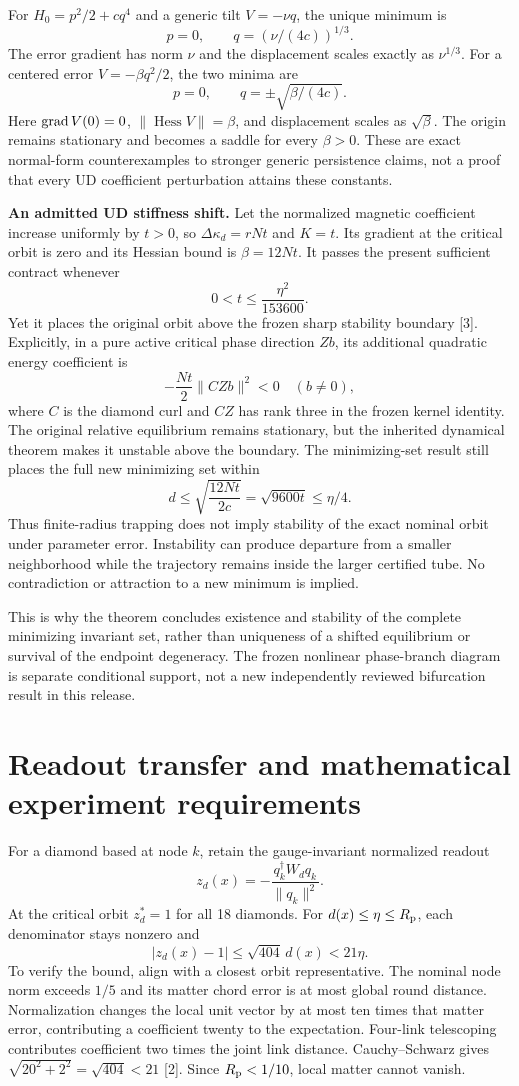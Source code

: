 \documentclass[11pt,a4paper]{article}
\begin{document}
For $H_0=p^2/2+cq^4$ and a generic tilt $V=-\nu q$, the unique minimum is
\[
p=0,\qquad q=(\nu/(4c))^{1/3}.
\]
The error gradient has norm $\nu$ and the displacement scales exactly as $\nu^{1/3}$. For a centered error $V=-\beta q^2/2$, the two minima are
\[
p=0,\qquad q=\pm\sqrt{\beta/(4c)}.
\]
Here $\operatorname{grad} V(0)=0$, $\|\operatorname{Hess}V\|=\beta$, and displacement scales as $\sqrt\beta$. The origin remains stationary and becomes a saddle for every $\beta>0$. These are exact normal-form counterexamples to stronger generic persistence claims, not a proof that every UD coefficient perturbation attains these constants.

\textbf{An admitted UD stiffness shift.} Let the normalized magnetic coefficient increase uniformly by $t>0$, so $\Delta\kappa_d=rNt$ and $K=t$. Its gradient at the critical orbit is zero and its Hessian bound is $\beta=12Nt$. It passes the present sufficient contract whenever
\[
0<t\le\frac{\eta^2}{153600}.
\]
Yet it places the original orbit above the frozen sharp stability boundary [3]. Explicitly, in a pure active critical phase direction $Zb$, its additional quadratic energy coefficient is
\[
-\frac{Nt}{2}\|CZb\|^2<0\quad(b\ne0),
\]
where $C$ is the diamond curl and $CZ$ has rank three in the frozen kernel identity. The original relative equilibrium remains stationary, but the inherited dynamical theorem makes it unstable above the boundary. The minimizing-set result still places the full new minimizing set within
\[
d\le\sqrt{\frac{12Nt}{2c}}=\sqrt{9600t}\le\eta/4.
\]
Thus finite-radius trapping does not imply stability of the exact nominal orbit under parameter error. Instability can produce departure from a smaller neighborhood while the trajectory remains inside the larger certified tube. No contradiction or attraction to a new minimum is implied.

This is why the theorem concludes existence and stability of the complete minimizing invariant set, rather than uniqueness of a shifted equilibrium or survival of the endpoint degeneracy. The frozen nonlinear phase-branch diagram is separate conditional support, not a new independently reviewed bifurcation result in this release.
\newpage
\section{Readout transfer and mathematical experiment requirements}
For a diamond based at node $k$, retain the gauge-invariant normalized readout
\[
z_d(x)=-\frac{q_k^\dagger W_dq_k}{\|q_k\|^2}.
\]
At the critical orbit $z_d^*=1$ for all 18 diamonds. For $d(x)\le\eta\le R_{\rm p}$, each denominator stays nonzero and
\[
\boxed{|z_d(x)-1|\le\sqrt{404}\,d(x)<21\eta.}
\]
To verify the bound, align with a closest orbit representative. The nominal node norm exceeds $1/5$ and its matter chord error is at most global round distance. Normalization changes the local unit vector by at most ten times that matter error, contributing a coefficient twenty to the expectation. Four-link telescoping contributes coefficient two times the joint link distance. Cauchy--Schwarz gives $\sqrt{20^2+2^2}=\sqrt{404}<21$ [2]. Since $R_{\rm p}<1/10$, local matter cannot vanish.
\end{document}
